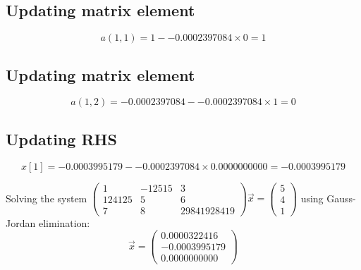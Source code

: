\documentclass{article}
\begin{document}
\subsection*{ \vspace{1em} Updating matrix element}
\[
a(1,1 ) = 1 - -0.0002397084 \times 0 = 1
\]
\subsection*{ \vspace{1em} Updating matrix element}
\[
a(1,2 ) = -0.0002397084 - -0.0002397084 \times 1 = 0
\]
\subsection*{ \vspace{1em} Updating RHS}
\[
x[1] = -0.0003995179 - -0.0002397084 \times 0.0000000000 = -0.0003995179
\]
\medskip

Solving the system $\begin{pmatrix}1 & -12515 & 3 \\ 124125 & 5 & 6 \\ 7 & 8 & 29841928419\end{pmatrix}\vec{x} = \begin{pmatrix}5 \\ 4 \\ 1\end{pmatrix}$ using Gauss-Jordan elimination:
\[
\vec{x} = \begin{pmatrix}0.0000322416 \\ -0.0003995179 \\ 0.0000000000\end{pmatrix}
\]
\bigskip

\hrulefill
\bigskip
\end{document}
